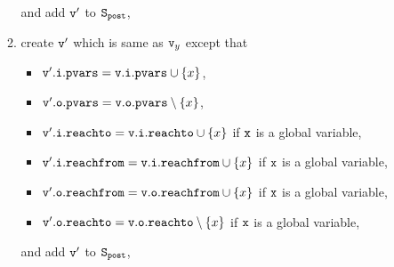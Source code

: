 \begin{itemize}
\begin{enumerate}
\begin{itemize}
\end{itemize}
and add $\tt v'$ to $\tt S_{post}$,
\item create $\tt v'$ which is same as $\mathtt{v}_y$ except that
\begin{itemize}
\item $\mathtt{v}'.\mathtt{i}.\mathtt{pvars} = \mathtt{v}.\mathtt{i}.\mathtt{pvars} \cup \left\{x\right\}$,
\item $\mathtt{v}'.\mathtt{o}.\mathtt{pvars} = \mathtt{v}.\mathtt{o}.\mathtt{pvars} \setminus \left\{x\right\}$,
\item $\mathtt{v}'.\mathtt{i}.\mathtt{reachto} = \mathtt{v}.\mathtt{i}.\mathtt{reachto} \cup \left\{x\right\}$ if $\tt x$ is a global variable,
 \item $\mathtt{v}'.\mathtt{i}.\mathtt{reachfrom} = \mathtt{v}.\mathtt{i}.\mathtt{reachfrom} \cup \left\{x\right\}$ if $\tt x$ is a global variable,
\item $\mathtt{v}'.\mathtt{o}.\mathtt{reachfrom} = \mathtt{v}.\mathtt{o}.\mathtt{reachfrom} \cup \left\{x\right\}$ if $\tt x$ is a global variable,
\item $\mathtt{v}'.\mathtt{o}.\mathtt{reachto} = \mathtt{v}.\mathtt{o}.\mathtt{reachto} \setminus \left\{x\right\}$ if $\tt x$ is a global variable,
\end{itemize}
and add $\tt v'$ to $\tt S_{post}$,
\end{enumerate}

	
 \end{itemize}
